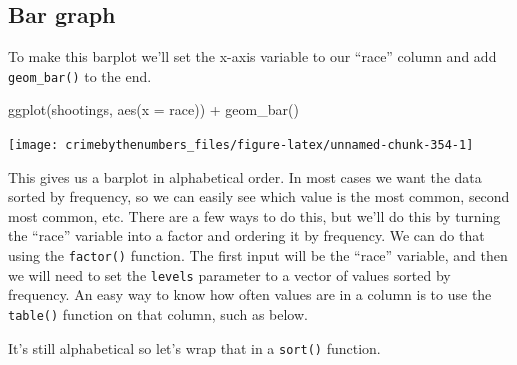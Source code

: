 \documentclass[
  a4paper,
]{krantz}
\makeatletter
\newenvironment{Shaded}{\begin{snugshade}}{\end{snugshade}}
\newcommand{\AttributeTok}[1]{\textcolor[rgb]{0.77,0.63,0.00}{#1}}
\newcommand{\CommentTok}[1]{\textcolor[rgb]{0.56,0.35,0.01}{\textit{#1}}}
\newcommand{\FunctionTok}[1]{\textcolor[rgb]{0.00,0.00,0.00}{#1}}
\newcommand{\NormalTok}[1]{#1}
\newcommand{\SpecialCharTok}[1]{\textcolor[rgb]{0.00,0.00,0.00}{#1}}
\newenvironment{kframe}{%
\medskip{}
\setlength{\fboxsep}{.8em}
 \def\at@end@of@kframe{}%
 \ifinner\ifhmode%
  \def\at@end@of@kframe{\end{minipage}}%
  \begin{minipage}{\columnwidth}%
 \fi\fi%
 \def\FrameCommand##1{\hskip\@totalleftmargin \hskip-\fboxsep
 \colorbox{shadecolor}{##1}\hskip-\fboxsep
     \hskip-\linewidth \hskip-\@totalleftmargin \hskip\columnwidth}%
 \MakeFramed {\advance\hsize-\width
   \@totalleftmargin\z@ \linewidth\hsize
   \@setminipage}}%
 {\par\unskip\endMakeFramed%
 \at@end@of@kframe}
\renewenvironment{Shaded}{\begin{kframe}}{\end{kframe}}
\makeatother
\begin{document}
\hypertarget{bar-graph}{%
\subsection{Bar graph}\label{bar-graph}}

To make this barplot we'll set the x-axis variable to our
``race'' column and add \texttt{geom\_bar()} to the end.

\begin{Shaded}
\begin{Highlighting}[]
\FunctionTok{ggplot}\NormalTok{(shootings, }\FunctionTok{aes}\NormalTok{(}\AttributeTok{x =}\NormalTok{ race)) }\SpecialCharTok{+}
  \FunctionTok{geom\_bar}\NormalTok{()}
\end{Highlighting}
\end{Shaded}

\begin{center}\texttt{[image: crimebythenumbers\_files/figure-latex/unnamed-chunk-354-1]} \end{center}

This gives us a barplot in alphabetical order. In most cases
we want the data sorted by frequency, so we can easily see
which value is the most common, second most common, etc.
There are a few ways to do this, but we'll do this by
turning the ``race'' variable into a factor and ordering it
by frequency. We can do that using the \texttt{factor()}
function. The first input will be the ``race'' variable, and
then we will need to set the \texttt{levels} parameter to a
vector of values sorted by frequency. An easy way to know
how often values are in a column is to use the
\texttt{table()} function on that column, such as below.

\begin{Shaded}
\end{Shaded}

It's still alphabetical so let's wrap that in a
\texttt{sort()} function.

\begin{Shaded}
\end{Shaded}
\end{document}
